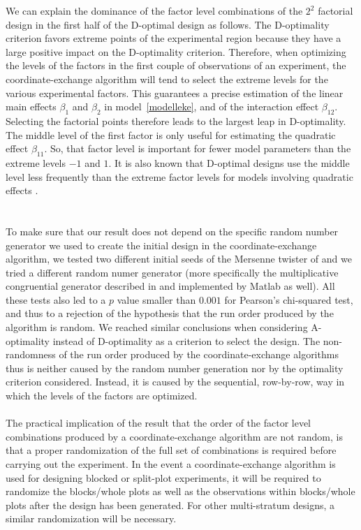We can explain the dominance of the factor level combinations of the $2^2$ factorial design in the first half of the D-optimal design as follows. The D-optimality criterion favors extreme points of the experimental region because they have a large positive impact on the D-optimality criterion. Therefore, when optimizing the levels of the factors in the first couple of observations of an experiment, the coordinate-exchange algorithm will tend to select the extreme levels for the various experimental factors. This guarantees a precise estimation of the linear main effects $\beta_1$ and $\beta_2$ in model~\eqref{modelleke}, and of the interaction effect $\beta_{12}$. Selecting the factorial points therefore leads to the largest leap in D-optimality. The middle level of the first factor is only useful for estimating the quadratic effect $\beta_{11}$. So, that factor level is important for fewer model parameters than the extreme levels $-1$ and $1$. It is also known that D-optimal designs use the middle level less frequently than the extreme factor levels for models involving quadratic effects \citep{atdoto}.\\
\\
\\
{\color{red}To make sure that our result does not depend on the specific random number generator we used to create the initial design in the coordinate-exchange algorithm, we tested two different initial seeds of the Mersenne twister of \cite{matsumoto} and we tried a different random numer generator (more specifically the multiplicative congruential generator described in \cite{park} and implemented by Matlab as well). All these tests also led to a $p$ value smaller than $0.001$ for Pearson's chi-squared test, and thus to a rejection of the hypothesis that the run order produced by the algorithm is random. We reached similar conclusions when considering A-optimality instead of D-optimality as a criterion to select the design. The non-randomness of the run order produced by the coordinate-exchange algorithms thus is neither caused by the random number generation nor by the optimality criterion considered. Instead, it is caused by the sequential, row-by-row, way in which the levels of the factors are optimized.
}
\\
\\
The practical implication of the result that the order of the factor level combinations produced by a coordinate-exchange algorithm are not random, is that a proper randomization of the full set of combinations is required before carrying out the experiment. In the event a coordinate-exchange algorithm is used for designing blocked or split-plot experiments, it will be required to randomize the blocks/whole plots as well as the observations within blocks/whole plots after the design has been generated. For other multi-stratum designs, a similar randomization will be necessary.\\

